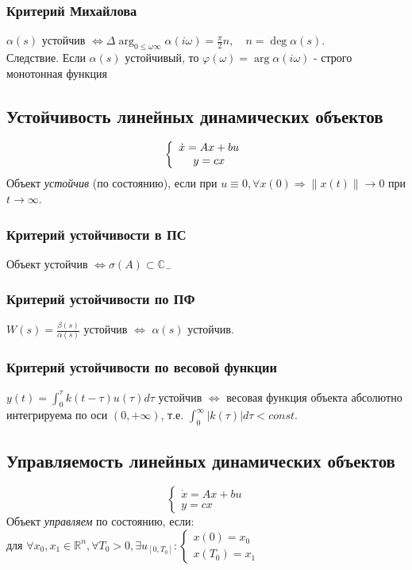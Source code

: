 \documentclass[A4]{article}
\begin{document}
\subsubsection{Критерий Михайлова}
$\alpha(s)$ устойчив $\Leftrightarrow\Delta\arg_{0\le\omega\infty}\alpha(i\omega)=\frac{\pi}{2}n,\quad n=\deg\alpha(s)$.\\
Следствие. Если $\alpha(s)$ устойчивый, то $\varphi(\omega)=\arg\alpha(i\omega)$ - строго монотонная функция
\subsection{Устойчивость линейных динамических объектов}
\begin{equation}
\left\{\begin{array}{cc}
\dot{x}=Ax+bu\\
y=cx
\end{array}\right.\\
\end{equation}
Объект \emph{устойчив} (по состоянию), если при $u\equiv0,\forall x(0)\Rightarrow\|x(t)\|\rightarrow0$ при $t\rightarrow\infty$.
\subsubsection{Критерий устойчивости в ПС}
Объект устойчив $\Leftrightarrow \sigma(A)\subset \mathbb{C}_{-}$
\subsubsection{Критерий устойчивости по ПФ}
$W(s)=\frac{\beta(s)}{\alpha(s)}$ устойчив $\Leftrightarrow$ $\alpha(s)$ устойчив.
\subsubsection{Критерий устойчивости по весовой функции}
$y(t)=\int_{0}^{\tau}k(t-\tau)u(\tau)d\tau$ устойчив $\Leftrightarrow$ весовая функция объекта абсолютно интегрируема по оси $(0,+\infty)$, т.е. $\int_{0}^{\infty}|k(\tau)|d\tau<const$.
\subsection{Управляемость линейных динамических объектов} 
\begin{equation}
\left\{\begin{array}{cc}
\dot{x}=Ax+bu\\
y=cx
\end{array}\right.
\end{equation}
Объект \emph{управляем} по состоянию, если: \\для $\forall x_0,x_1\in\mathbb{R}^n,\forall T_0>0,\exists u_{[0,T_0]}:
\left\{\begin{array}{cc}
	x(0)=x_0\\
	x(T_0)=x_1
\end{array}\right.$
\end{document}
